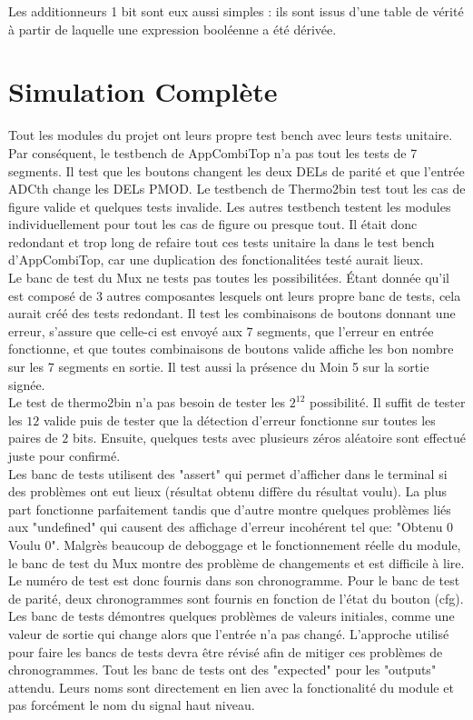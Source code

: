 \documentclass[a11paper]{article}
\begin{document}
Les additionneurs 1 bit sont eux aussi simples : ils sont issus d’une table
de vérité à partir de laquelle une expression booléenne a été dérivée.

\section{Simulation Complète}
Tout les modules du projet ont leurs propre test bench avec leurs tests unitaire. Par conséquent, le testbench de AppCombiTop n'a pas
tout les tests de 7 segments. Il test que les boutons changent les deux DELs de parité et que l'entrée ADCth change les DELs PMOD.
Le testbench de Thermo2bin test tout les cas de figure valide et quelques tests invalide. Les autres testbench testent les modules
individuellement pour tout les cas de figure ou presque tout. Il était donc redondant et trop long de refaire tout ces tests unitaire la
dans le test bench d'AppCombiTop, car une duplication des fonctionalitées testé aurait lieux.
\\
Le banc de test du Mux ne tests pas toutes les possibilitées. Étant donnée qu'il est composé de 3 autres composantes lesquels ont leurs
propre banc de tests, cela aurait créé des tests redondant. Il test les combinaisons de boutons donnant une erreur,
s'assure que celle-ci est envoyé aux 7 segments, que l'erreur en entrée fonctionne, et que toutes combinaisons de boutons valide affiche
les bon nombre sur les 7 segments en sortie. Il test aussi la présence du Moin 5 sur la sortie signée.
\\
Le test de thermo2bin n'a pas besoin de tester les $2^{12}$ possibilité. Il suffit de tester les $12$ valide puis de tester que la
détection d'erreur fonctionne sur toutes les paires de $2$ bits. Ensuite, quelques tests avec plusieurs zéros aléatoire sont effectué
juste pour confirmé.
\\
Les banc de tests utilisent des "assert" qui permet d'afficher dans le terminal si des problèmes ont eut lieux (résultat obtenu diffère
du résultat voulu). La plus part fonctionne parfaitement tandis que d'autre montre quelques problèmes liés aux "undefined" qui causent des
affichage d'erreur incohérent tel que: "Obtenu 0 Voulu 0". Malgrès beaucoup de deboggage et le fonctionnement réelle du module, le banc de
test du Mux montre des problème de changements et est difficile à lire. Le numéro de test est donc fournis dans son chronogramme. Pour le
banc de test de parité, deux chronogrammes sont fournis en fonction de l'état du bouton (cfg). Les banc de tests démontres quelques
problèmes de valeurs initiales, comme une valeur de sortie qui change alors que l'entrée n'a pas changé. L'approche utilisé pour faire
les bancs de tests devra être révisé afin de mitiger ces problèmes de chronogrammes. Tout les banc de tests ont des "expected" pour les
"outputs" attendu. Leurs noms sont directement en lien avec la fonctionalité du module et pas forcément le nom du signal haut niveau.
\end{document}
